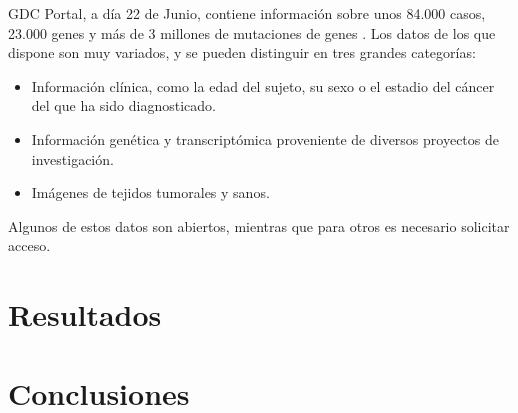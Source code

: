 GDC Portal, a día 22 de Junio, contiene información sobre unos 84.000 casos, 23.000 genes y más de 3 millones de mutaciones de genes \cite{GDCPortal}. Los datos de los que dispone son muy variados, y se pueden distinguir en tres grandes categorías:

\begin{itemize}
	\item Información clínica, como la edad del sujeto, su sexo o el estadio del cáncer del que ha sido diagnosticado.
	\item Información genética y transcriptómica proveniente de diversos proyectos de investigación.
	\item Imágenes de tejidos tumorales y sanos.
\end{itemize} 

Algunos de estos datos son abiertos, mientras que para otros es necesario solicitar acceso.

\section{Resultados}

\section{Conclusiones}

